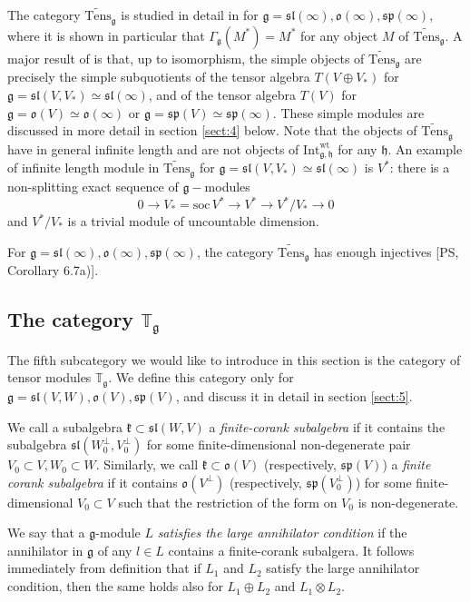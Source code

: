 \documentclass{svmult}
\newcommand{\TT}{\mathbb{T}}
\newcommand{\wt}{\mathrm{wt}}
\renewcommand{\sp}{\mathfrak{sp}}
\renewcommand{\sl}{\mathfrak{sl}}
\newcommand{\kk}{\mathfrak{k}}
\newcommand{\oo}{\mathfrak{o}}
\newcommand{\hh}{\mathfrak{h}}
\renewcommand{\gg}{\mathfrak{g}}
\newcommand{\Soc}{\mathrm{soc}}
\begin{document}
The category $\widetilde{\mathrm{Tens}}_{\gg}$ is studied in detail in
\cite{ps} for 
$\gg = \sl(\infty), \oo(\infty), \sp(\infty)$, where it is shown in
particular that 
$\Gamma_{\gg}(M^*) = M^*$ for any object $M$ of
$\widetilde{\mathrm{Tens}}_{\gg}$. A major result of \cite{ps} is
that, up to isomorphism, the simple objects of
$\widetilde{\mathrm{Tens}}_{\gg}$ are precisely the simple
subquotients of the tensor algebra 
$T(V\oplus V_*)$ for $\gg = \sl(V,V_*) \simeq \sl(\infty)$, and of the
tensor algebra 
$T(V)$ for $\gg = \oo(V) \simeq \oo(\infty)$ or $\gg = \sp(V) \simeq\sp(\infty)$. 
These simple modules are discussed in more detail in section
\ref{sect:4} below. Note that the objects of 
$\widetilde{\mathrm{Tens}}_{\gg}$ have in general infinite length and are not objects of $\mathrm{Int}^{\wt}_{\gg,\hh}$ for any $\hh$. 
An example of infinite length module in
$\widetilde{\mathrm{Tens}}_{\gg}$ for $\gg = \sl(V,V_*) \simeq\sl(\infty)$ is 
$V^*$: there is a non-splitting exact sequence of $\gg-$modules 
$$ 0 \to V_* = \Soc\,V^* \rightarrow V^* \rightarrow V^*/V_*\rightarrow 0 $$ and $V^*/V_*$ is a 
trivial module of uncountable dimension.

For $\gg = \sl(\infty), \oo(\infty), \sp(\infty)$, the category
$\widetilde{\mathrm{Tens}}_\gg$ 
has enough injectives [PS, Corollary 6.7a)].


\subsection{The category $\TT_{\gg}$}\label{sect:3.5}
The fifth subcategory we would like to introduce in this section is
the category of tensor modules 
$\TT_{\gg}$. We define this category only for $\gg=\sl(V,W),\oo(V),\sp(V)$, and discuss it in detail in section \ref{sect:5}. 

We call a subalgebra $\kk\subset \sl(W,V)$  a \textit{finite-corank
 subalgebra} if it contains the subalgebra 
$\sl(W_0^\perp,V_0^\perp)$ for some finite-dimensional non-degenerate pair
$V_0\subset V,W_0\subset W$. Similarly, we call $\kk\subset \oo(V)$
(respectively, 
$\sp(V)$) a \textit{finite corank subalgebra}  if it contains $ \oo(V^\perp)$ (respectively, $\sp(V_0^\perp)$) for some finite-dimensional $V_0\subset V$ such that the restriction of the form on $V_0$ is non-degenerate.

We say that a $\gg$-module $L$ {\it satisfies the large annihilator
  condition} if the annihilator in $\gg$ of any 
$l\in L$ contains a finite-corank subalgera. It follows immediately
from definition that if $L_1$ and $L_2$ 
satisfy the large annihilator condition, then the same holds also for $L_1\oplus L_2$ and $L_1\otimes L_2$.
\end{document}
